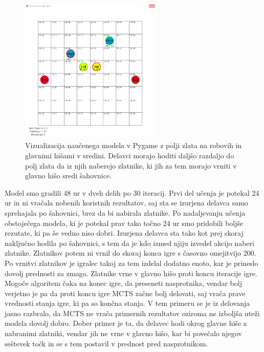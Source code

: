 \documentclass[a4paper, 12pt]{book}
\begin{document}
\begin{figure}[h]
	\begin{center}
		\includegraphics[width=0.6\textwidth]{photos/third-2018-11-14.pdf}
	\end{center}
	\caption{Vizualizacija naučenega modela v Pygame z polji zlata na robovih in glavnimi hišami v sredini. Delavci morajo hoditi daljšo razdaljo do polj zlata da iz njih naberejo zlatnike, ki jih za tem morajo vrniti v glavno hišo sredi šahovnice. }
	\label{vizualizacijaRezultatovSpremembaZlata}
\end{figure}

Model smo gradili 48 ur v dveh delih po 30 iteracij.
Prvi del učenja je potekal 24 ur in ni vračala nobenih koristnih rezultatov, saj sta se izurjena delavca samo sprehajala po šahovnici, brez da bi nabirala zlatnike.
Po nadaljevanju učenja obstoječega modela, ki je potekal prav tako točno 24 ur smo pridobili boljše rezutate, ki pa še vedno niso dobri.
Izurjena delavca sta tako kot prej skoraj naključno hodila po šahovnici, s tem da je kdo izmed njiju izvedel akcijo naberi zlatnike.
Zlatnikov potem ni vrnil do skoraj konca igre s časovno omejitvijo 200. Po vrnitvi zlatnikov je igralec takoj za tem izdelal dodatno enoto, kar je prineslo dovolj prednosti za zmago.
Zlatnike vrne v glavno hišo proti koncu iteracije igre. Mogoče algoritem čaka na konec igre, da preseneti nasprotnika, vendar bolj verjetno je pa da proti koncu igre MCTS začne bolj delovati, saj vrača prave vrednosti stanja igre, ki pa so končna stanja.
V tem primeru se je iz delovanja jasno razbralo, da MCTS ne vrača primernih rezultatov oziroma ne izboljša uteži modela dovolj dobro.
Dober primer je ta, da delavec hodi okrog glavne hiše z nabranimi zlatniki, vendar jih ne vrne v glavno hišo, kar bi povečalo njegov seštevek točk in se s tem postavil v prednost pred nasprotnikom.
\end{document}
